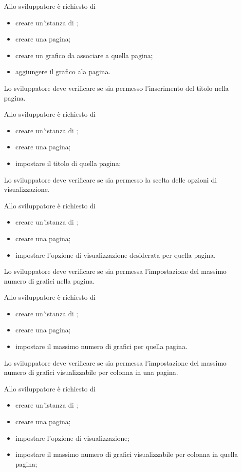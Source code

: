 		Allo sviluppatore è richiesto di
		\begin{itemize}
			\item creare un'istanza di \projectname{};
			\item creare una pagina;
			\item creare un grafico da associare a quella pagina;
			\item aggiungere il grafico ala pagina.
		\end{itemize}

	Lo sviluppatore deve verificare se sia permesso l'inserimento del titolo nella pagina.
		
		Allo sviluppatore è richiesto di
		\begin{itemize}
			\item creare un'istanza di \projectname{};
			\item creare una pagina;
			\item impostare il titolo di quella pagina;
		\end{itemize}

	Lo sviluppatore deve verificare se sia permesso la scelta delle opzioni di visualizzazione.
		
		Allo sviluppatore è richiesto di
		\begin{itemize}
			\item creare un'istanza di \projectname{};
			\item creare una pagina;
			\item impostare l'opzione di visualizzazione desiderata per quella pagina.
		\end{itemize}

	Lo sviluppatore deve verificare se sia permessa l'impostazione del massimo numero di grafici nella pagina.
		
		Allo sviluppatore è richiesto di
		\begin{itemize}
			\item creare un'istanza di \projectname{};
			\item creare una pagina;
			\item impostare il massimo numero di grafici per quella pagina.
		\end{itemize}

	Lo sviluppatore deve verificare se sia permessa l'impostazione del massimo numero di grafici visualizzabile per colonna in una pagina.
		
		Allo sviluppatore è richiesto di
		\begin{itemize}
			\item creare un'istanza di \projectname{};
			\item creare una pagina;
			\item impostare l'opzione di visualizzazione;
			\item impostare il massimo numero di grafici visualizzabile per colonna in quella pagina;
		\end{itemize}

